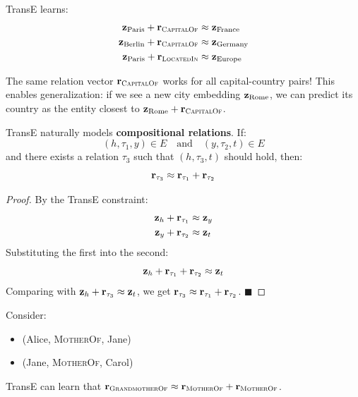 \begin{notechapter}
\begin{example}
TransE learns:
\begin{align*}
\mathbf{z}_{\text{Paris}} + \mathbf{r}_{\textsc{CapitalOf}} &\approx \mathbf{z}_{\text{France}} \\
\mathbf{z}_{\text{Berlin}} + \mathbf{r}_{\textsc{CapitalOf}} &\approx \mathbf{z}_{\text{Germany}} \\
\mathbf{z}_{\text{Paris}} + \mathbf{r}_{\textsc{LocatedIn}} &\approx \mathbf{z}_{\text{Europe}}
\end{align*}

The same relation vector $\mathbf{r}_{\textsc{CapitalOf}}$ works for all capital-country pairs! This enables generalization: if we see a new city embedding $\mathbf{z}_{\text{Rome}}$, we can predict its country as the entity closest to $\mathbf{z}_{\text{Rome}} + \mathbf{r}_{\textsc{CapitalOf}}$.
\end{example}

\begin{proposition}
TransE naturally models \textbf{compositional relations}. If:
\[
(h, \tau_1, y) \in E \quad \text{and} \quad (y, \tau_2, t) \in E
\]
and there exists a relation $\tau_3$ such that $(h, \tau_3, t)$ should hold, then:
\[
\mathbf{r}_{\tau_3} \approx \mathbf{r}_{\tau_1} + \mathbf{r}_{\tau_2}
\]
\end{proposition}

\begin{proof}
By the TransE constraint:
\begin{align*}
\mathbf{z}_h + \mathbf{r}_{\tau_1} &\approx \mathbf{z}_y \\
\mathbf{z}_y + \mathbf{r}_{\tau_2} &\approx \mathbf{z}_t
\end{align*}
Substituting the first into the second:
\[
\mathbf{z}_h + \mathbf{r}_{\tau_1} + \mathbf{r}_{\tau_2} \approx \mathbf{z}_t
\]
Comparing with $\mathbf{z}_h + \mathbf{r}_{\tau_3} \approx \mathbf{z}_t$, we get $\mathbf{r}_{\tau_3} \approx \mathbf{r}_{\tau_1} + \mathbf{r}_{\tau_2}$. $\blacksquare$
\end{proof}

\begin{example}
Consider:
\begin{itemize}
    \item (Alice, \textsc{MotherOf}, Jane)
    \item (Jane, \textsc{MotherOf}, Carol)
\end{itemize}
TransE can learn that $\mathbf{r}_{\textsc{GrandmotherOf}} \approx \mathbf{r}_{\textsc{MotherOf}} + \mathbf{r}_{\textsc{MotherOf}}$.


\end{example}
\end{notechapter}
